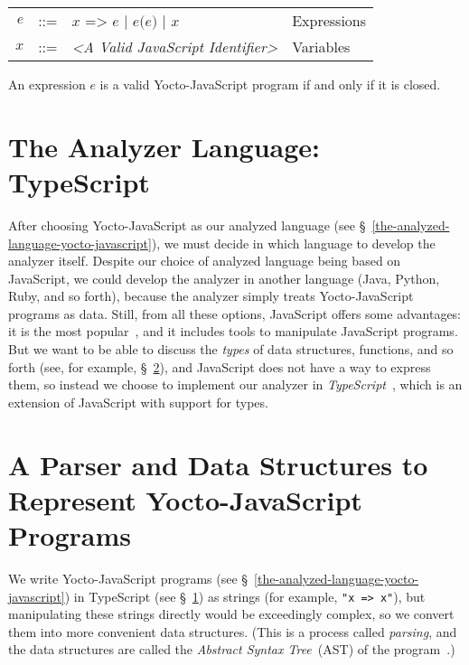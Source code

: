 \documentclass[12pt, oneside]{book}
\begin{document}
\begin{center}
\begin{tabular}{rcll}
$e$ & ::= & $x\texttt{ => }e$ | $e\texttt{(}e\texttt{)}$ | $x$ & Expressions \\
$x$ & ::= & \emph{<A Valid JavaScript Identifier>} & Variables \\
\end{tabular}
\end{center}

An expression $e$ is a valid Yocto-JavaScript program if and only if it is closed.

\section{The Analyzer Language: TypeScript}
\label{the-analyzer-language-typescript}

After choosing Yocto-JavaScript as our analyzed language (see §~\ref{the-analyzed-language-yocto-javascript}), we must decide in which language to develop the analyzer itself. Despite our choice of analyzed language being based on JavaScript, we could develop the analyzer in another language (Java, Python, Ruby, and so forth), because the analyzer simply treats Yocto-JavaScript programs as data. Still, from all these options, JavaScript offers some advantages: it is the most popular~\cite{stack-overflow-developer-survey, jet-brains-developer-survey}, and it includes tools to manipulate JavaScript programs. But we want to be able to discuss the \emph{types} of data structures, functions, and so forth (see, for example, §~\ref{a-parser-and-data-structures-to-represent-yocto-javascript-programs}), and JavaScript does not have a way to express them, so instead we choose to implement our analyzer in \emph{TypeScript}~\cite{typescript, typescript-deep-dive, understanding-typescript}, which is an extension of JavaScript with support for types.

\section{A Parser and Data Structures to Represent Yocto-JavaScript Programs}
\label{a-parser-and-data-structures-to-represent-yocto-javascript-programs}

We write Yocto-JavaScript programs (see §~\ref{the-analyzed-language-yocto-javascript}) in TypeScript (see §~\ref{the-analyzer-language-typescript}) as strings (for example, \texttt{"x => x"}), but manipulating these strings directly would be exceedingly complex, so we convert them into more convenient data structures. (This is a process called \emph{parsing}, and the data structures are called the \emph{Abstract Syntax Tree}~(AST) of the program~\cite[§~4]{dragon-book}.)
\end{document}
